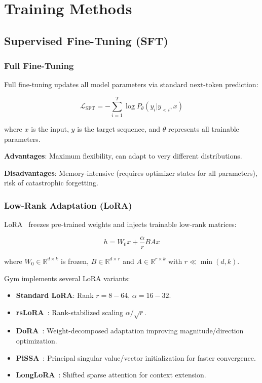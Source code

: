 \section{Training Methods}


\subsection{Supervised Fine-Tuning (SFT)}

\subsubsection{Full Fine-Tuning}

Full fine-tuning updates all model parameters via standard next-token prediction:

\begin{equation}
\mathcal{L}_{\text{SFT}} = -\sum_{i=1}^{T} \log P_\theta(y_i | y_{<i}, x)
\end{equation}

where $x$ is the input, $y$ is the target sequence, and $\theta$ represents all trainable parameters.

\textbf{Advantages}: Maximum flexibility, can adapt to very different distributions.

\textbf{Disadvantages}: Memory-intensive (requires optimizer states for all parameters), risk of catastrophic forgetting.

\subsubsection{Low-Rank Adaptation (LoRA)}

LoRA~\citep{hu2021lora} freezes pre-trained weights and injects trainable low-rank matrices:

\begin{equation}
h = W_0 x + \frac{\alpha}{r} BA x
\end{equation}

where $W_0 \in \mathbb{R}^{d \times k}$ is frozen, $B \in \mathbb{R}^{d \times r}$ and $A \in \mathbb{R}^{r \times k}$ with $r \ll \min(d, k)$.

Gym implements several LoRA variants:

\begin{itemize}
\item \textbf{Standard LoRA}: Rank $r = 8-64$, $\alpha = 16-32$.
\item \textbf{rsLoRA}~\citep{kalajdzievski2023rslora}: Rank-stabilized scaling $\alpha/\sqrt{r}$.
\item \textbf{DoRA}~\citep{liu2024dora}: Weight-decomposed adaptation improving magnitude/direction optimization.
\item \textbf{PiSSA}~\citep{meng2024pissa}: Principal singular value/vector initialization for faster convergence.
\item \textbf{LongLoRA}~\citep{chen2023longlora}: Shifted sparse attention for context extension.
\end{itemize}

